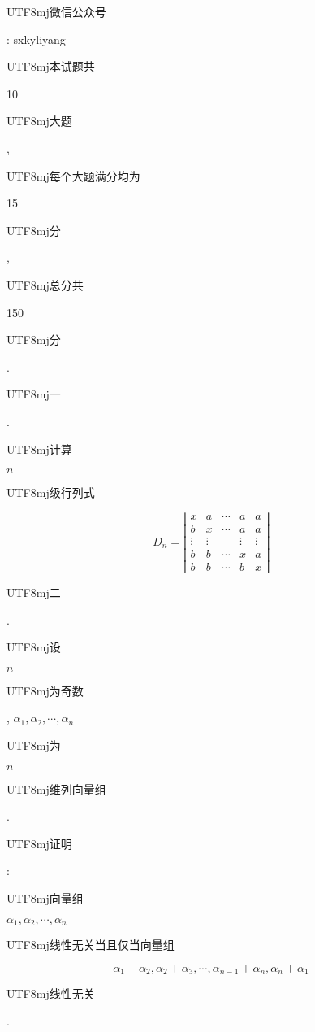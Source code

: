 \documentclass[10pt]{article}
\begin{document}
\begin{CJK}{UTF8}{mj}微信公众号\end{CJK}: sxkyliyang

\begin{CJK}{UTF8}{mj}本试题共\end{CJK} 10 \begin{CJK}{UTF8}{mj}大题\end{CJK}, \begin{CJK}{UTF8}{mj}每个大题满分均为\end{CJK} 15 \begin{CJK}{UTF8}{mj}分\end{CJK}, \begin{CJK}{UTF8}{mj}总分共\end{CJK} 150 \begin{CJK}{UTF8}{mj}分\end{CJK}.

\begin{CJK}{UTF8}{mj}一\end{CJK}. \begin{CJK}{UTF8}{mj}计算\end{CJK} $n$ \begin{CJK}{UTF8}{mj}级行列式\end{CJK}
$$
D_{n}=\left|\begin{array}{ccccc}
x & a & \cdots & a & a \\
b & x & \cdots & a & a \\
\vdots & \vdots & & \vdots & \vdots \\
b & b & \cdots & x & a \\
b & b & \cdots & b & x
\end{array}\right|
$$
\begin{CJK}{UTF8}{mj}二\end{CJK}. \begin{CJK}{UTF8}{mj}设\end{CJK} $n$ \begin{CJK}{UTF8}{mj}为奇数\end{CJK}, $\alpha_{1}, \alpha_{2}, \cdots, \alpha_{n}$ \begin{CJK}{UTF8}{mj}为\end{CJK} $n$ \begin{CJK}{UTF8}{mj}维列向量组\end{CJK}. \begin{CJK}{UTF8}{mj}证明\end{CJK}: \begin{CJK}{UTF8}{mj}向量组\end{CJK} $\alpha_{1}, \alpha_{2}, \cdots, \alpha_{n}$ \begin{CJK}{UTF8}{mj}线性无关当且仅当向量组\end{CJK}
$$
\alpha_{1}+\alpha_{2}, \alpha_{2}+\alpha_{3}, \cdots, \alpha_{n-1}+\alpha_{n}, \alpha_{n}+\alpha_{1}
$$
\begin{CJK}{UTF8}{mj}线性无关\end{CJK}.
\end{document}
